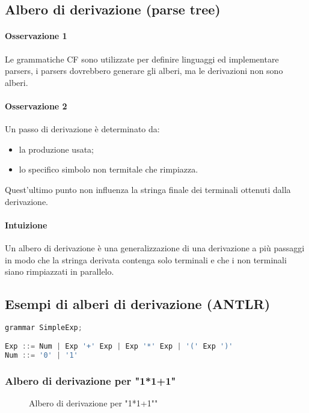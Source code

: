 \subsection{Albero di derivazione (parse tree)}
\paragraph{Osservazione 1}
Le grammatiche CF sono utilizzate per definire linguaggi ed implementare
parsers, i parsers dovrebbero generare gli alberi, ma le derivazioni non
sono alberi.

\paragraph{Osservazione 2}
Un passo di derivazione è determinato da:
\begin{itemize}
  \item la produzione usata;
  \item lo specifico simbolo non termitale che rimpiazza.
\end{itemize}
Quest'ultimo punto non influenza la stringa finale dei terminali ottenuti
dalla derivazione.

\paragraph{Intuizione}
Un albero di derivazione è una generalizzazione di una derivazione a più
passaggi in modo che la stringa derivata contenga solo terminali e che i non
terminali siano rimpiazzati in parallelo.

\subsection{Esempi di alberi di derivazione (ANTLR)}
\begin{lstlisting}[language=Java, caption={Grammatica ANTLR}]
grammar SimpleExp;

Exp ::= Num | Exp '+' Exp | Exp '*' Exp | '(' Exp ')'
Num ::= '0' | '1'
\end{lstlisting}

\subsubsection{Albero di derivazione per "1*1+1"}
\begin{figure}[ht]
    \centering
    \caption{Albero di derivazione per "1*1+1""}
    \label{fig:dtree-1}
\end{figure}
